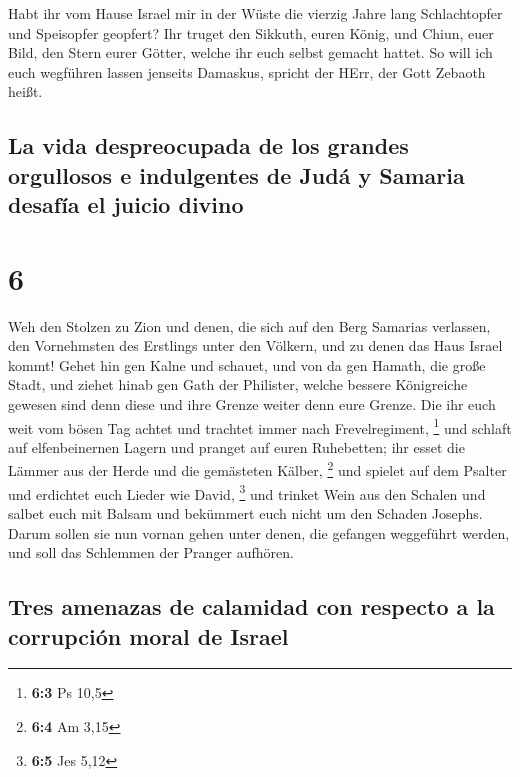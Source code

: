  Habt ihr vom Hause Israel mir in der Wüste die vierzig
Jahre lang Schlachtopfer und Speisopfer geopfert?  Ihr
truget den Sikkuth, euren König, und Chiun, euer Bild, den Stern eurer
Götter, welche ihr euch selbst gemacht hattet.  So will
ich euch wegführen lassen jenseits Damaskus, spricht der HErr, der Gott
Zebaoth heißt.

\hypertarget{la-vida-despreocupada-de-los-grandes-orgullosos-e-indulgentes-de-juduxe1-y-samaria-desafuxeda-el-juicio-divino}{%
\subsection{La vida despreocupada de los grandes orgullosos e
indulgentes de Judá y Samaria desafía el juicio
divino}\label{la-vida-despreocupada-de-los-grandes-orgullosos-e-indulgentes-de-juduxe1-y-samaria-desafuxeda-el-juicio-divino}}

\hypertarget{section-5}{%
\section{6}\label{section-5}}

 Weh den Stolzen zu Zion und denen, die sich auf den Berg
Samarias verlassen, den Vornehmsten des Erstlings unter den Völkern, und
zu denen das Haus Israel kommt!  Gehet hin gen Kalne und
schauet, und von da gen Hamath, die große Stadt, und ziehet hinab gen
Gath der Philister, welche bessere Königreiche gewesen sind denn diese
und ihre Grenze weiter denn eure Grenze.  Die ihr euch
weit vom bösen Tag achtet und trachtet immer nach Frevelregiment,
\footnote{\textbf{6:3} Ps 10,5}  und schlaft auf
elfenbeinernen Lagern und pranget auf euren Ruhebetten; ihr esset die
Lämmer aus der Herde und die gemästeten Kälber, \footnote{\textbf{6:4}
  Am 3,15}  und spielet auf dem Psalter und erdichtet euch
Lieder wie David, \footnote{\textbf{6:5} Jes 5,12}  und
trinket Wein aus den Schalen und salbet euch mit Balsam und bekümmert
euch nicht um den Schaden Josephs.  Darum sollen sie nun
vornan gehen unter denen, die gefangen weggeführt werden, und soll das
Schlemmen der Pranger aufhören.

\hypertarget{tres-amenazas-de-calamidad-con-respecto-a-la-corrupciuxf3n-moral-de-israel}{%
\subsection{Tres amenazas de calamidad con respecto a la corrupción
moral de
Israel}\label{tres-amenazas-de-calamidad-con-respecto-a-la-corrupciuxf3n-moral-de-israel}}

